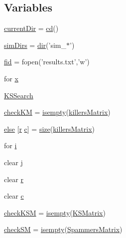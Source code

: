 \subsection*{Variables}
\begin{DoxyCompactItemize}
\item 
\hyperlink{a00031_af32eb97339f1e9d37b5540de2cbc79c9}{current\+Dir} = \hyperlink{a00113_abe327856a9ee2f30f3ccafe4dc9edf5e}{cd}()
\item 
\hyperlink{a00031_aae5035eb84b89176ed5b06e136325eff}{sim\+Dirs} = \hyperlink{a00113_a4ca269cf93df1b512b52174c1a256fe5}{dir}('sim\+\_\+$\ast$')
\item 
\hyperlink{a00031_ae9011d40c6f13e68e6f07156e0da7c5d}{fid} = fopen('results.\+txt','w')
\item 
for \hyperlink{a00031_a7265972fe485274cfff77a9bb07b8fce}{x}
\item 
\hyperlink{a00031_af04f94b875b4f18fd2d6bd47d989f2b8}{K\+S\+Search}
\item 
\hyperlink{a00031_ac9c871eaf7455dc0d274ec20c5c69ac2}{check\+K\+M} = \hyperlink{a00025_ac10445404f4b83302522defb59e25ef7}{isempty}(\hyperlink{a00030_ab372fd9c8bb38cf3c78e995c0698b0ca}{killers\+Matrix})
\item 
\hyperlink{a00031_af5946383720aa572eb93e1e63afc23c2}{else} \mbox{[}\hyperlink{a00031_ac862e7284527eb913b1351c8bfb8e079}{r} \hyperlink{a00035_a6be92348ba85ef257b11d06209e1d7b6}{c}\mbox{]} = \hyperlink{a00104_ae113ea7f9e515a12ac4b5595c6faf61e}{size}(\hyperlink{a00030_ab372fd9c8bb38cf3c78e995c0698b0ca}{killers\+Matrix})
\item 
for \hyperlink{a00031_a66a219c6834c25b0073a6bb84e1e0117}{i}
\item 
clear \hyperlink{a00031_ad34e9c7e9ae69ae0b9f1866faed5e4ad}{j}
\item 
clear \hyperlink{a00031_ac862e7284527eb913b1351c8bfb8e079}{r}
\item 
clear \hyperlink{a00031_a8e54ca14679a1ce9245a3b7d55d95570}{c}
\item 
\hyperlink{a00031_a67eb148eecfd241148ce3711f058ac2b}{check\+K\+S\+M} = \hyperlink{a00025_ac10445404f4b83302522defb59e25ef7}{isempty}(\hyperlink{a00030_ab18f9eabd5f873bd17d226d786bc22df}{K\+S\+Matrix})
\item 
\hyperlink{a00031_ae80cf4c5bf659247b45bbad5d22dec52}{check\+S\+M} = \hyperlink{a00025_ac10445404f4b83302522defb59e25ef7}{isempty}(\hyperlink{a00030_a5bca8ffaecd726e70d088f2e00c9b4e0}{Spammers\+Matrix})
\end{DoxyCompactItemize}



